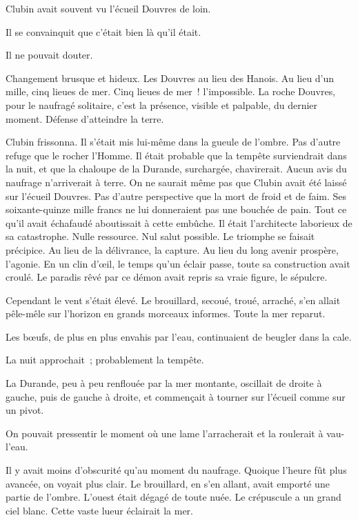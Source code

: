 \documentclass[french,twoside]{book} %
\begin{document}
Clubin avait souvent vu l’écueil Douvres de loin.\par
Il se convainquit que c’était bien là qu’il était.\par
Il ne pouvait douter.\par
Changement brusque et hideux. Les Douvres au lieu des Hanois. Au lieu d’un mille, cinq lieues de mer. Cinq lieues de mer ! l’impossible. La roche Douvres, pour le naufragé solitaire, c’est la présence, visible et palpable, du dernier moment. Défense d’atteindre la terre.\par
 Clubin frissonna. Il s’était mis lui-même dans la gueule de l’ombre. Pas d’autre refuge que le rocher l’Homme. Il était probable que la tempête surviendrait dans la nuit, et que la chaloupe de la Durande, surchargée, chavirerait. Aucun avis du naufrage n’arriverait à terre. On ne saurait même pas que Clubin avait été laissé sur l’écueil Douvres. Pas d’autre perspective que la mort de froid et de faim. Ses soixante-quinze mille francs ne lui donneraient pas une bouchée de pain. Tout ce qu’il avait échafaudé aboutissait à cette embûche. Il était l’architecte laborieux de sa catastrophe. Nulle ressource. Nul salut possible. Le triomphe se faisait précipice. Au lieu de la délivrance, la capture. Au lieu du long avenir prospère, l’agonie. En un clin d’œil, le temps qu’un éclair passe, toute sa construction avait croulé. Le paradis rêvé par ce démon avait repris sa vraie figure, le sépulcre.\par
Cependant le vent s’était élevé. Le brouillard, secoué, troué, arraché, s’en allait pêle-mêle sur l’horizon en grands morceaux informes. Toute la mer reparut.\par
Les bœufs, de plus en plus envahis par l’eau, continuaient de beugler dans la cale.\par
La nuit approchait ; probablement la tempête.\par
La Durande, peu à peu renflouée par la mer montante, oscillait de droite à gauche, puis de gauche à droite, et commençait à tourner sur l’écueil comme sur un pivot.\par
On pouvait pressentir le moment où une lame l’arracherait et la roulerait à vau-l’eau.\par
Il y avait moins d’obscurité qu’au moment du  naufrage. Quoique l’heure fût plus avancée, on voyait plus clair. Le brouillard, en s’en allant, avait emporté une partie de l’ombre. L’ouest était dégagé de toute nuée. Le crépuscule a un grand ciel blanc. Cette vaste lueur éclairait la mer.\par
\end{document}
